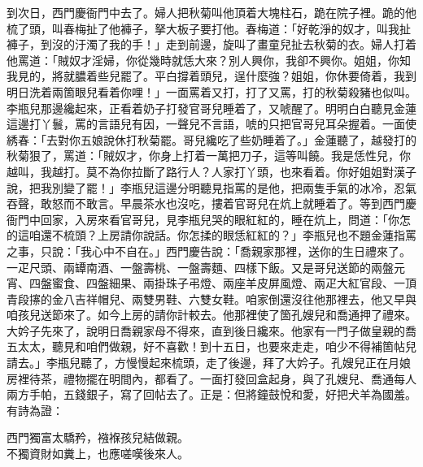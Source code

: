 到次日，西門慶衙門中去了。婦人把秋菊叫他頂着大塊柱石，跪在院子裡。跪的他梳了頭，叫春梅扯了他褲子，拏大板子要打他。春梅道：「好乾淨的奴才，叫我扯褲子，到沒的汙濁了我的手！」走到前邊，旋叫了畫童兒扯去秋菊的衣。婦人打着他罵道：「賊奴才淫婦，你從幾時就恁大來？別人興你，我卻不興你。姐姐，你知我見的，將就膿着些兒罷了。平白撐着頭兒，逞什麼強？姐姐，你休要倚着，我到明日洗着兩箇眼兒看着你哩！」{}一面罵着又打，打了又罵，打的秋菊殺豬也似叫。李瓶兒那邊纔起來，正看着奶子打發官哥兒睡着了，又唬醒了。明明白白聽見金蓮這邊打丫鬟，罵的言語兒有因，一聲兒不言語，唬的只把官哥兒耳朵握着。一面使綉春：「去對你五娘說休打秋菊罷。哥兒纔吃了些奶睡着了。」金蓮聽了，越發打的秋菊狠了，罵道：「賊奴才，你身上打着一萬把刀子，這等叫饒。我是恁性兒，你越叫，我越打。{}莫不為你拉斷了路行人？人家打丫頭，也來看着。你好姐姐對漢子說，把我別變了罷！」李瓶兒這邊分明聽見指罵的是他，把兩隻手氣的冰冷，忍氣吞聲，敢怒而不敢言。早晨茶水也沒吃，摟着官哥兒在炕上就睡着了。等到西門慶衙門中回家，入房來看官哥兒，見李瓶兒哭的眼紅紅的，睡在炕上，問道：「你怎的這咱還不梳頭？上房請你說話。你怎揉的眼恁紅紅的？」李瓶兒也不題金蓮指罵之事，只說：「我心中不自在。」西門慶告說：「喬親家那裡，送你的生日禮來了。一疋尺頭、兩罈南酒、一盤壽桃、一盤壽麵、四樣下飯。又是哥兒送節的兩盤元宵、四盤蜜食、四盤細果、兩掛珠子弔燈、兩座羊皮屏風燈、兩疋大紅官段、一頂青段㩟的金八吉祥帽兒、兩雙男鞋、六雙女鞋。咱家倒還沒往他那裡去，他又早與咱孩兒送節來了。如今上房的請你計較去。他那裡使了箇孔嫂兒和喬通押了禮來。大妗子先來了，說明日喬親家母不得來，直到後日纔來。他家有一門子做皇親的喬五太太，聽見和咱們做親，好不喜歡！到十五日，也要來走走，咱少不得補箇帖兒請去。」李瓶兒聽了，方慢慢起來梳頭，走了後邊，拜了大妗子。孔嫂兒正在月娘房裡待茶，禮物擺在明間內，都看了。一面打發回盒起身，與了孔嫂兒、喬通每人兩方手帕，五錢銀子，寫了回帖去了。正是：但將鐘鼓悅和愛，好把犬羊為國羞。有詩為證：

\begin{myquote}
西門獨富太驕矜，襁褓孩兒結做親。\\不獨資財如糞上，也應嗟嘆後來人。
\end{myquote}
